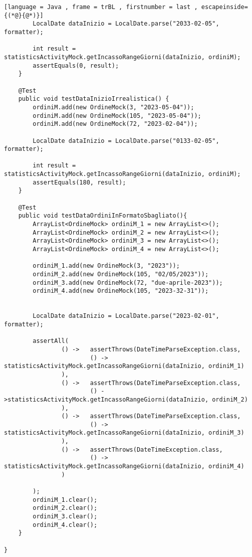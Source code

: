 \begin{lstlisting}[language = Java , frame = trBL , firstnumber = last , escapeinside={(*@}{@*)}]
        LocalDate dataInizio = LocalDate.parse("2033-02-05", formatter);

        int result = statisticsActivityMock.getIncassoRangeGiorni(dataInizio, ordiniM);
        assertEquals(0, result);
    }

    @Test
    public void testDataInizioIrrealistica() {
        ordiniM.add(new OrdineMock(3, "2023-05-04"));
        ordiniM.add(new OrdineMock(105, "2023-05-04"));
        ordiniM.add(new OrdineMock(72, "2023-02-04"));

        LocalDate dataInizio = LocalDate.parse("0133-02-05", formatter);

        int result = statisticsActivityMock.getIncassoRangeGiorni(dataInizio, ordiniM);
        assertEquals(180, result);
    }

    @Test
    public void testDataOrdiniInFormatoSbagliato(){
        ArrayList<OrdineMock> ordiniM_1 = new ArrayList<>();
        ArrayList<OrdineMock> ordiniM_2 = new ArrayList<>();
        ArrayList<OrdineMock> ordiniM_3 = new ArrayList<>();
        ArrayList<OrdineMock> ordiniM_4 = new ArrayList<>();

        ordiniM_1.add(new OrdineMock(3, "2023"));
        ordiniM_2.add(new OrdineMock(105, "02/05/2023"));
        ordiniM_3.add(new OrdineMock(72, "due-aprile-2023"));
        ordiniM_4.add(new OrdineMock(105, "2023-32-31"));


        LocalDate dataInizio = LocalDate.parse("2023-02-01", formatter);

        assertAll(
                () ->   assertThrows(DateTimeParseException.class,
                        () -> statisticsActivityMock.getIncassoRangeGiorni(dataInizio, ordiniM_1)
                ),
                () ->   assertThrows(DateTimeParseException.class,
                        () ->statisticsActivityMock.getIncassoRangeGiorni(dataInizio, ordiniM_2)
                ),
                () ->   assertThrows(DateTimeParseException.class,
                        () -> statisticsActivityMock.getIncassoRangeGiorni(dataInizio, ordiniM_3)
                ),
                () ->   assertThrows(DateTimeException.class,
                        () -> statisticsActivityMock.getIncassoRangeGiorni(dataInizio, ordiniM_4)
                )

        );
        ordiniM_1.clear();
        ordiniM_2.clear();
        ordiniM_3.clear();
        ordiniM_4.clear();
    }

}

\end{lstlisting}

